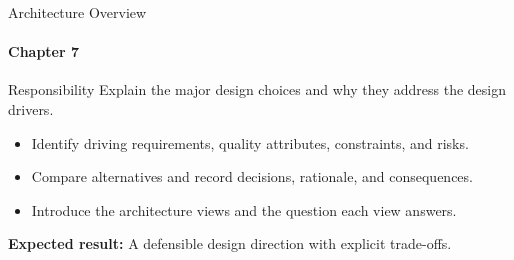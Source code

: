 \begin{frame}{Architecture Overview}
\framesubtitle{Chapter 7}
\begin{block}{Responsibility}
Explain the major design choices and why they address the design drivers.
\end{block}
\begin{itemize}
  \item Identify driving requirements, quality attributes, constraints, and risks.
  \item Compare alternatives and record decisions, rationale, and consequences.
  \item Introduce the architecture views and the question each view answers.
\end{itemize}
\vspace{0.15cm}
\textbf{Expected result:} A defensible design direction with explicit trade-offs.
\end{frame}
